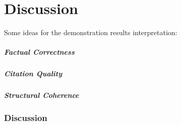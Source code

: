 \chapter{Discussion}



Some ideas for the demonstration results interpretation:

\paragraph{Factual Correctness}

\paragraph{Citation Quality}

\paragraph{Structural Coherence}

\subsection{Discussion}

%
